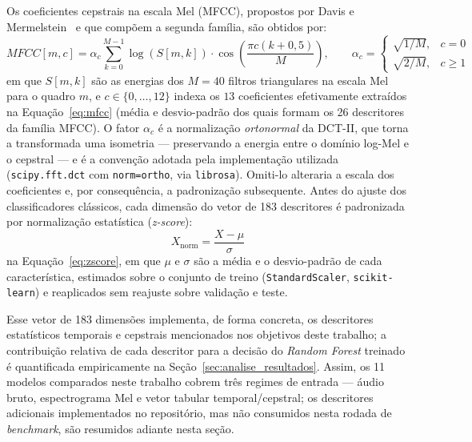 \documentclass[12pt,a4paper]{article}
\begin{document}
\noindent
Os coeficientes cepstrais na escala Mel (MFCC), propostos por Davis e
Mermelstein~\cite{davis1980mfcc} e que compõem a segunda família, são obtidos
por:
\begin{equation}
	\label{eq:mfcc}
	MFCC[m,c] = \alpha_c \sum_{k=0}^{M-1}\log(S[m,k])\cdot
	\cos\!\left(\frac{\pi c(k+0{,}5)}{M}\right),
	\qquad
	\alpha_c = \begin{cases}
		\sqrt{1/M}, & c = 0\\[2pt]
		\sqrt{2/M}, & c \geq 1
	\end{cases}
\end{equation}
\noindent
em que $S[m,k]$ são as energias dos $M=40$ filtros triangulares na escala
Mel para o quadro $m$, e $c \in \{0,\dots,12\}$ indexa os $13$ coeficientes
efetivamente extraídos na Equação~\ref{eq:mfcc} (média e desvio-padrão dos
quais formam os \num{26} descritores da família MFCC). O fator $\alpha_c$ é a
normalização \emph{ortonormal} da DCT-II, que torna a transformada uma isometria
--- preservando a energia entre o domínio log-Mel e o cepstral --- e é a
convenção adotada pela implementação utilizada
(\texttt{scipy.fft.dct} com \texttt{norm=\textquotesingle ortho\textquotesingle},
via \texttt{librosa}). Omiti-lo alteraria a escala dos coeficientes e, por
consequência, a padronização subsequente. Antes do ajuste dos
classificadores clássicos, cada dimensão do vetor de \num{183} descritores é
padronizada por normalização estatística (\textit{z-score}):
\begin{equation}
	\label{eq:zscore}
	X_{\mathrm{norm}} = \frac{X - \mu}{\sigma}
\end{equation}
\noindent
na Equação~\ref{eq:zscore}, em que $\mu$ e $\sigma$ são a média e o
desvio-padrão de cada característica, estimados sobre o conjunto de treino (\texttt{StandardScaler},
\texttt{scikit-learn}) e reaplicados sem reajuste sobre validação e teste.

\noindent
Esse vetor de \num{183} dimensões implementa, de forma concreta, os
descritores estatísticos temporais e cepstrais mencionados nos objetivos deste
trabalho; a contribuição relativa de cada descritor para a decisão do
\textit{Random Forest} treinado é quantificada empiricamente na
Seção~\ref{sec:analise_resultados}. Assim, os \num{11} modelos
comparados neste trabalho cobrem três regimes de entrada --- áudio bruto,
espectrograma Mel e vetor tabular temporal/cepstral; os descritores adicionais
implementados no repositório, mas não consumidos nesta rodada de
\textit{benchmark}, são resumidos adiante nesta seção.
\end{document}
